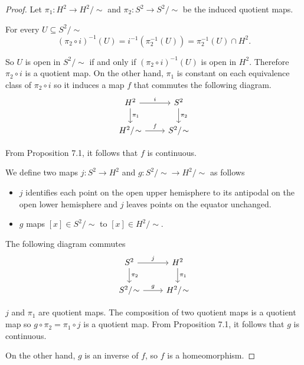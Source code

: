 \begin{proof}
    Let \( \pi_{1}: H^{2} \to H^{2}/\!\sim \) and \( \pi_{2}: S^{2} \to S^{2}/\!\sim \) be the induced quotient maps.

    For every \( U \subseteq S^{2}/\!\sim \)
    \[
        {(\pi_{2} \circ i)}^{-1}(U) = i^{-1}(\pi_{2}^{-1}(U)) = \pi_{2}^{-1}(U) \cap H^{2}.
    \]

    So \( U \) is open in \( S^{2}/\!\sim \) if and only if \(  {(\pi_{2} \circ i)}^{-1}(U) \) is open in \( H^{2} \). Therefore \( \pi_{2} \circ i \) is a quotient map. On the other hand, \( \pi_{1} \) is constant on each equivalence class of \( \pi_{2}\circ i \) so it induces a map \( f \) that commutes the following diagram.
    \[
        \begin{tikzcd}
            H^{2} \arrow{r}{i} \arrow{d}{\pi_{1}} & S^{2} \arrow{d}{\pi_{2}} \\
            H^{2}/\!\sim \arrow{r}{f} & S^{2}/\!\sim
        \end{tikzcd}
    \]

    From Proposition 7.1, it follows that \( f \) is continuous.

    We define two maps \( j: S^{2} \to H^{2} \) and \( g: S^{2}/\!\sim \to H^{2}/\!\sim \) as follows
    \begin{itemize}
        \item \( j \) identifies each point on the open upper hemisphere to its antipodal on the open lower hemisphere and \( j \) leaves points on the equator unchanged.
        \item \( g \) maps \( [x] \in S^{2}/\!\sim \) to \( [x] \in H^{2}/\!\sim \).
    \end{itemize}

    The following diagram commutes
    \[
        \begin{tikzcd}
            S^{2} \arrow{r}{j} \arrow{d}{\pi_{2}} & H^{2} \arrow{d}{\pi_{1}} \\
            S^{2}/\!\sim \arrow{r}{g}         & H^{2}/\!\sim
        \end{tikzcd}
    \]

    \( j \) and \( \pi_{1} \) are quotient maps. The composition of two quotient maps is a quotient map so \( g \circ \pi_{2} = \pi_{1} \circ j \) is a quotient map. From Proposition 7.1, it follows that \( g \) is continuous.

    On the other hand, \( g \) is an inverse of \( f \), so \( f \) is a homeomorphism.
\end{proof}


